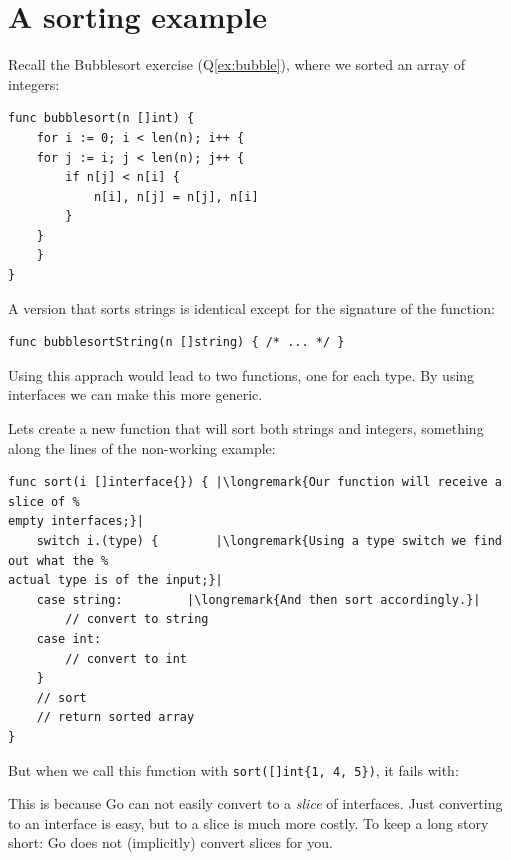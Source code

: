 \section{A sorting example}
Recall the Bubblesort exercise (Q\ref{ex:bubble}), where we sorted an
array of integers:
\begin{lstlisting}
func bubblesort(n []int) {
    for i := 0; i < len(n); i++ {
	for j := i; j < len(n); j++ {
	    if n[j] < n[i] {
		    n[i], n[j] = n[j], n[i]
	    }
	}
    }
}
\end{lstlisting}
A version that sorts strings is identical except for the signature of
the function:
\begin{lstlisting}
func bubblesortString(n []string) { /* ... */ }
\end{lstlisting}
Using this apprach would lead to two functions, one for each type. By using
interfaces we can make this more  generic.

Lets create a new function that will sort both strings and
integers, something along the lines of the non-working example:
\begin{lstlisting}
func sort(i []interface{}) { |\longremark{Our function will receive a slice of %
empty interfaces;}|
    switch i.(type) {        |\longremark{Using a type switch we find out what the %
actual type is of the input;}|
	case string:         |\longremark{And then sort accordingly.}|
	    // convert to string
	case int:
	    // convert to int
    }
    // sort
    // return sorted array
}
\end{lstlisting}
\showremarks
But when we call this function with \lstinline|sort([]int{1, 4, 5})|, it
fails with:

This is because Go can not easily convert to a \emph{slice} of interfaces.
Just converting to an interface is easy, but to a slice is much more costly.
To keep a 
long story short: Go does not (implicitly) convert slices for you.

